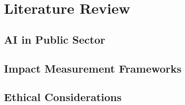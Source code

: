

\chapter{Literature Review}
\section{AI in Public Sector}
\lipsum[5]
\section{Impact Measurement Frameworks}
\lipsum[6]
\section{Ethical Considerations}
\lipsum[7]